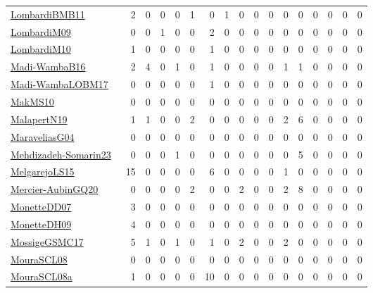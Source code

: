 {\begin{longtable}{l*{16}{r}}
\href{papers/LombardiBMB11.pdf}{LombardiBMB11}~\cite{LombardiBMB11} & 2 & 0 & 0 & 0 & 1 & 0 & 1 & 0 & 0 & 0 & 0 & 0 & 0 & 0 & 0 & 0\\
\href{papers/LombardiM09.pdf}{LombardiM09}~\cite{LombardiM09} & 0 & 0 & 1 & 0 & 0 & 2 & 0 & 0 & 0 & 0 & 0 & 0 & 0 & 0 & 0 & 0\\
\href{papers/LombardiM10.pdf}{LombardiM10}~\cite{LombardiM10} & 1 & 0 & 0 & 0 & 0 & 1 & 0 & 0 & 0 & 0 & 0 & 0 & 0 & 0 & 0 & 0\\
\href{papers/Madi-WambaB16.pdf}{Madi-WambaB16}~\cite{Madi-WambaB16} & 2 & 4 & 0 & 1 & 0 & 1 & 0 & 0 & 0 & 0 & 1 & 1 & 0 & 0 & 0 & 0\\
\href{papers/Madi-WambaLOBM17.pdf}{Madi-WambaLOBM17}~\cite{Madi-WambaLOBM17} & 0 & 0 & 0 & 0 & 0 & 1 & 0 & 0 & 0 & 0 & 0 & 0 & 0 & 0 & 0 & 0\\
\href{papers/MakMS10.pdf}{MakMS10}~\cite{MakMS10} & 0 & 0 & 0 & 0 & 0 & 0 & 0 & 0 & 0 & 0 & 0 & 0 & 0 & 0 & 0 & 0\\
\href{papers/MalapertN19.pdf}{MalapertN19}~\cite{MalapertN19} & 1 & 1 & 0 & 0 & 2 & 0 & 0 & 0 & 0 & 0 & 2 & 6 & 0 & 0 & 0 & 0\\
\href{papers/MaraveliasG04.pdf}{MaraveliasG04}~\cite{MaraveliasG04} & 0 & 0 & 0 & 0 & 0 & 0 & 0 & 0 & 0 & 0 & 0 & 0 & 0 & 0 & 0 & 0\\
\href{papers/Mehdizadeh-Somarin23.pdf}{Mehdizadeh-Somarin23}~\cite{Mehdizadeh-Somarin23} & 0 & 0 & 0 & 1 & 0 & 0 & 0 & 0 & 0 & 0 & 0 & 5 & 0 & 0 & 0 & 0\\
\href{papers/MelgarejoLS15.pdf}{MelgarejoLS15}~\cite{MelgarejoLS15} & 15 & 0 & 0 & 0 & 0 & 6 & 0 & 0 & 0 & 0 & 1 & 0 & 0 & 0 & 0 & 0\\
\href{papers/Mercier-AubinGQ20.pdf}{Mercier-AubinGQ20}~\cite{Mercier-AubinGQ20} & 0 & 0 & 0 & 0 & 2 & 0 & 0 & 2 & 0 & 0 & 2 & 8 & 0 & 0 & 0 & 0\\
\href{papers/MonetteDD07.pdf}{MonetteDD07}~\cite{MonetteDD07} & 3 & 0 & 0 & 0 & 0 & 0 & 0 & 0 & 0 & 0 & 0 & 0 & 0 & 0 & 0 & 0\\
\href{papers/MonetteDH09.pdf}{MonetteDH09}~\cite{MonetteDH09} & 4 & 0 & 0 & 0 & 0 & 0 & 0 & 0 & 0 & 0 & 0 & 0 & 0 & 0 & 0 & 0\\
\href{papers/MossigeGSMC17.pdf}{MossigeGSMC17}~\cite{MossigeGSMC17} & 5 & 1 & 0 & 1 & 0 & 1 & 0 & 2 & 0 & 0 & 2 & 0 & 0 & 0 & 0 & 0\\
\href{papers/MouraSCL08.pdf}{MouraSCL08}~\cite{MouraSCL08} & 0 & 0 & 0 & 0 & 0 & 0 & 0 & 0 & 0 & 0 & 0 & 0 & 0 & 0 & 0 & 0\\
\href{papers/MouraSCL08a.pdf}{MouraSCL08a}~\cite{MouraSCL08a} & 1 & 0 & 0 & 0 & 0 & 10 & 0 & 0 & 0 & 0 & 0 & 0 & 0 & 0 & 0 & 0\\

\end{longtable}}
